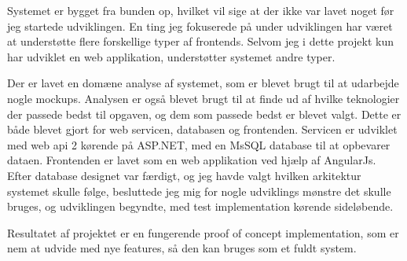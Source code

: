 Systemet er bygget fra bunden op, hvilket vil sige at der ikke var lavet noget
før jeg startede udviklingen. En ting jeg fokuserede på under udviklingen har
været at understøtte flere forskellige typer af frontends. Selvom jeg i dette
projekt kun har udviklet en web applikation, understøtter systemet andre typer. 

Der er lavet en domæne analyse af systemet, som er blevet brugt til at udarbejde
nogle mockups. Analysen er også blevet brugt til at finde ud af hvilke
teknologier der passede bedst til opgaven, og dem som passede bedst er blevet
valgt. Dette er både blevet gjort for web servicen, databasen og frontenden.
Servicen er udviklet med web api 2 kørende på ASP.NET, med en MsSQL database
til at opbevarer dataen. Frontenden er lavet som en web applikation ved hjælp
af AngularJs. Efter database designet var færdigt, og jeg havde valgt hvilken
arkitektur systemet skulle følge, besluttede jeg mig for nogle udviklings
mønstre det skulle bruges, og udviklingen begyndte, med test implementation
kørende sideløbende. 

Resultatet af projektet er en fungerende proof of concept implementation, som er
nem at udvide med nye features, så den kan bruges som et fuldt system.